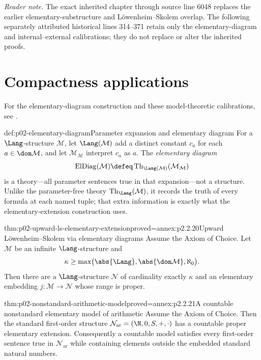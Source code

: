 \noindent\textit{Reader note.} The exact inherited chapter through source line 6048
replaces the earlier elementary-substructure and L\"owenheim--Skolem overlap.
The following separately attributed historical lines 314--371 retain only
the elementary-diagram and internal--external calibrations; they do not replace
or alter the inherited proofs.

\section{Compactness applications}
\label{sec:p02-first-order-compactness-applications}

For the elementary-diagram construction and these model-theoretic
calibrations, see \cite{Hodges1993,Marker2002}.

\begin{hbdefinition}{def:p02-elementary-diagram}{Parameter expansion and elementary diagram}
For a \(\Lang\)-structure \(\mathcal M\), let
\(\Lang(\mathcal M)\) add a distinct constant \(c_a\) for each
\(a\in\dom\mathcal M\), and let \(\mathcal M_{\mathcal M}\) interpret
\(c_a\) as \(a\).  The \emph{elementary diagram}
\[
 \operatorname{ElDiag}(\mathcal M)
 \defeq
 \operatorname{Th}_{\Lang(\mathcal M)}(\mathcal M_{\mathcal M})
\]
is a theory---all parameter sentences true in that expansion---not a
structure.  Unlike the parameter-free theory
\(\operatorname{Th}_{\Lang}(\mathcal M)\), it records the truth of every
formula at each named tuple; that extra information is exactly what the
elementary-extension construction uses.
\end{hbdefinition}

\begin{hbtheorem}{thm:p02-upward-ls-elementary-extension}{proved=annex:p2.2.20}{Upward L\"owenheim--Skolem via elementary diagrams}
Assume the Axiom of Choice.  Let \(\mathcal M\) be an infinite
\(\Lang\)-structure and
\[
 \kappa\geq
 \max\bigl(\abs{\Lang},\abs{\dom\mathcal M},\aleph_0\bigr).
\]
Then there are a \(\Lang\)-structure \(\mathcal N\) of cardinality exactly
\(\kappa\) and an elementary embedding
\(j:\mathcal M\to\mathcal N\) whose range is proper.
\end{hbtheorem}

\begin{hbcorollary}{thm:p02-nonstandard-arithmetic-model}{proved=annex:p2.2.21}{A countable nonstandard elementary model of arithmetic}
Assume the Axiom of Choice.  Then the standard first-order structure
\(\mathcal N_{\mathrm{ar}}=(\N,0,S,+,\cdot)\) has a countable proper
elementary extension.  Consequently a countable model satisfies every
first-order sentence true in \(\mathcal N_{\mathrm{ar}}\) while containing
elements outside the embedded standard natural numbers.
\end{hbcorollary}

